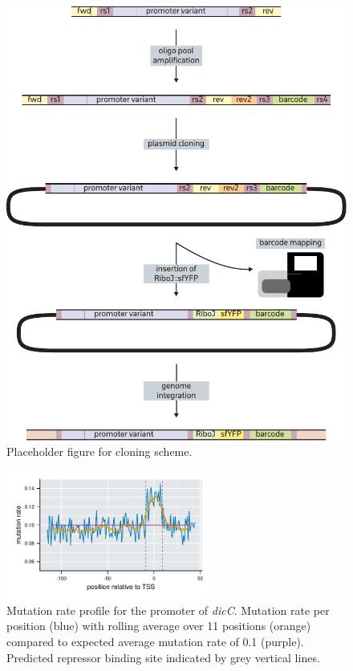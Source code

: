 \begin{figure}[H]
    \centering
    \includegraphics{../figures/cloning_scheme.pdf}
    \caption{Placeholder figure for cloning scheme.}
    \label{fig:cloning}
\end{figure}

\begin{figure}[H]
    \centering
    \includegraphics[width=0.6\textwidth]{../figures/dicCp_mutation_rate_oligos.pdf}
    \caption{Mutation rate profile for the promoter of \textit{dicC}. Mutation rate per position (blue) with rolling average over 11 positions (orange) compared to expected average mutation rate of 0.1 (purple). Predicted repressor binding site indicated by grey vertical lines.}
    \label{fig:dicCp}
\end{figure}